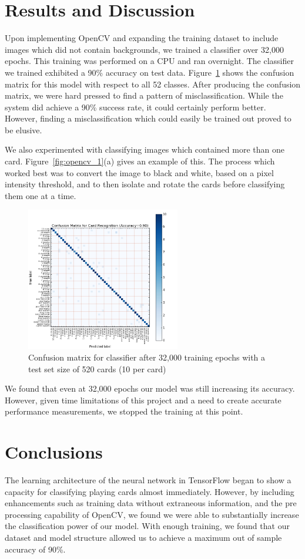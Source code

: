 \documentclass[letterpaper]{article}
\begin{document}
\section{Results and Discussion}
Upon implementing OpenCV and expanding the training dataset to include images which did not contain backgrounds, we trained a classifier over 32,000 epochs. This training was performed on a CPU and ran overnight. 
The classifier we trained exhibited a 90\% accuracy on test data. Figure~\ref{fig:confus} shows the confusion matrix for this model with respect to all 52 classes.  After producing the confusion matrix, we were hard pressed to find a pattern of misclassification.  While the system did achieve a 90\% success rate, it could certainly perform better.  However, finding a misclassification which could easily be trained out proved to be elusive.

We also experimented with classifying images which contained more than one card. Figure~\ref{fig:opencv_1}(a) gives an example of this. The process which worked best was to convert the image to black and white, based on a pixel intensity threshold, and to then isolate and rotate the cards before classifying them one at a time.
\begin{figure}[!tbp]
  \centering
  \includegraphics[width=0.6\textwidth]{results/confusion2.jpg}
  \caption{\label{fig:confus}Confusion matrix for classifier after 32,000 training epochs with a test set size of 520 cards (10 per card)}
\end{figure}

We found that even at 32,000 epochs our model was still increasing its accuracy.  However, given time limitations of this project and a need to create accurate performance measurements, we stopped the training at this point.

\section{Conclusions}
The learning architecture of the neural network in TensorFlow began to show a capacity for classifying playing cards almost immediately. However, by including enhancements such as training data without extraneous information, and the pre processing capability of OpenCV, we found we were able to substantially increase the classification power of our model. With enough training, we found that our dataset and model structure allowed us to achieve a maximum out of sample accuracy of 90\%. 
\end{document}
